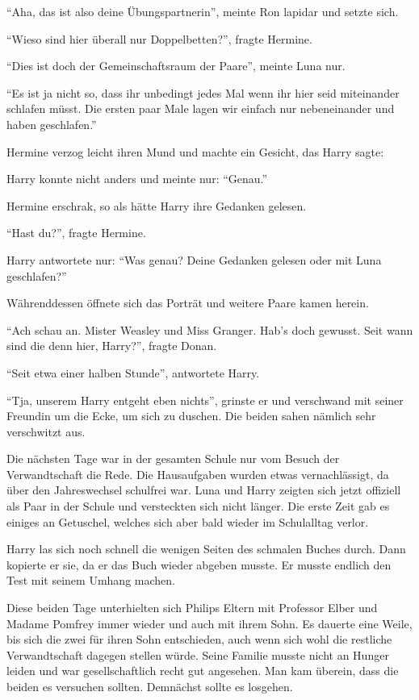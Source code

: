 \enquote{Aha, das ist also deine Übungspartnerin}, meinte Ron lapidar und setzte sich.

\enquote{Wieso sind hier überall nur Doppelbetten?}, fragte Hermine.

\enquote{Dies ist doch der Gemeinschaftsraum der Paare}, meinte Luna nur.

\enquote{Es ist ja nicht so, dass ihr unbedingt jedes Mal wenn ihr hier seid miteinander schlafen müsst. Die ersten paar Male lagen wir einfach nur nebeneinander und haben geschlafen.}

Hermine verzog leicht ihren Mund und machte ein Gesicht, das Harry sagte: 

Harry konnte nicht anders und meinte nur: \enquote{Genau.}

Hermine erschrak, so als hätte Harry ihre Gedanken gelesen.

\enquote{Hast du?}, fragte Hermine.

Harry antwortete nur: \enquote{Was genau? Deine Gedanken gelesen oder mit Luna geschlafen?}

Währenddessen öffnete sich das Porträt und weitere Paare kamen herein.

\enquote{Ach schau an. Mister Weasley und Miss Granger. Hab's doch gewusst. Seit wann sind die denn hier, Harry?}, fragte Donan.

\enquote{Seit etwa einer halben Stunde}, antwortete Harry.

\enquote{Tja, unserem Harry entgeht eben nichts}, grinste er und verschwand mit seiner Freundin um die Ecke, um sich zu duschen. Die beiden sahen nämlich sehr verschwitzt aus.

Die nächsten Tage war in der gesamten Schule nur vom Besuch der Verwandtschaft die Rede. Die Hausaufgaben wurden etwas vernachlässigt, da über den Jahreswechsel schulfrei war. Luna und Harry zeigten sich jetzt offiziell als Paar in der Schule und versteckten sich nicht länger. Die erste Zeit gab es einiges an Getuschel, welches sich aber bald wieder im Schulalltag verlor.

Harry las sich noch schnell die wenigen Seiten des schmalen Buches durch. Dann kopierte er sie, da er das Buch wieder abgeben musste. Er musste endlich den Test mit seinem Umhang machen.

Diese beiden Tage unterhielten sich Philips Eltern mit Professor Elber und Madame Pomfrey immer wieder und auch mit ihrem Sohn. Es dauerte eine Weile, bis sich die zwei für ihren Sohn entschieden, auch wenn sich wohl die restliche Verwandtschaft dagegen stellen würde. Seine Familie musste nicht an Hunger leiden und war gesellschaftlich recht gut angesehen. Man kam überein, dass die beiden es versuchen sollten. Demnächst sollte es losgehen.

